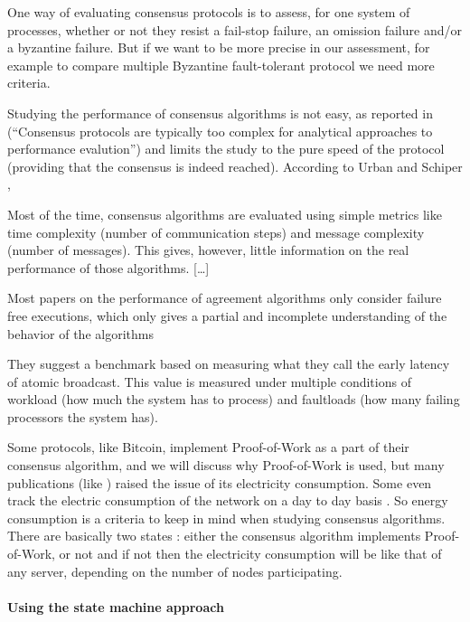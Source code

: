 \documentclass[11pt, twocolumn]{article}
\begin{document}
One way of evaluating consensus protocols is to assess, for one system of processes, whether or not they resist a fail-stop failure, an omission failure and/or a byzantine failure. But if we want to be more precise in our assessment, for example to compare multiple Byzantine fault-tolerant protocol we need more criteria.

Studying the performance of consensus algorithms is not easy, as reported in \cite{analysisperf} (“Consensus protocols are typically too complex for analytical approaches to performance evalution”) and \cite{failureDetection} limits the study to the pure speed of the protocol (providing that the consensus is indeed reached). According to Urban and Schiper \cite{comparing},

\begin{displayquote}
    Most of the time, consensus algorithms are evaluated using
    simple metrics like time complexity (number of communication steps) and message complexity (number of messages). This gives, however, little information on the real
    performance of those algorithms. […]

    Most papers on the performance of agreement algorithms only consider failure free executions, which only gives a partial and incomplete
    understanding of the behavior of the algorithms
\end{displayquote}
They suggest a benchmark based on measuring what they call the early latency of atomic broadcast.  This value is measured under multiple conditions of workload (how much the system has to process) and faultloads (how many failing processors the system has).

Some protocols, like Bitcoin, implement Proof-of-Work as a part of their consensus algorithm, and we will discuss why Proof-of-Work is used, but many publications (like \cite{decarbonizing} ) raised the issue of its electricity consumption. Some even track the electric consumption of the network on a day to day basis \cite{cambridgeIndex}. So energy consumption is a criteria to keep in mind when studying consensus algorithms.
There are basically two states : either the consensus algorithm implements Proof-of-Work, or not and if not then the electricity consumption will be like that of any server, depending on the number of nodes participating.

\paragraph{Using the state machine approach}
\end{document}
